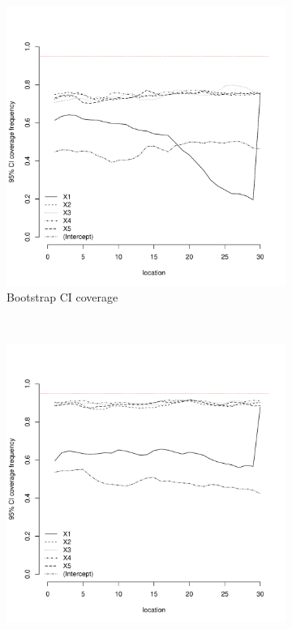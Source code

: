 \documentclass[authoryear, review, 11pt]{elsarticle}
\begin{document}
\begin{figure}
	\vspace{-30mm}
	\centering
	\begin{subfigure}[b]{0.45\textwidth}
	\centering
		\includegraphics[width=\textwidth]{../../figures/simulation/15.4.profile_bootstrap_coverage.pdf}
		\caption{Bootstrap CI coverage}
	\end{subfigure}%
	~ %
	\begin{subfigure}[b]{0.45\textwidth}
	\centering
		\includegraphics[width=\textwidth]{../../figures/simulation/15.4.profile_se_coverage.pdf}

\end{subfigure}
\end{figure}
\end{document}
